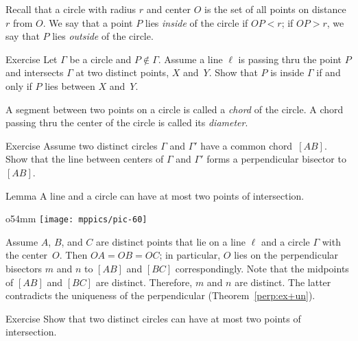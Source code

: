 Recall that a circle with radius $r$ and center $O$ is the set of all points on distance $r$ from $O$.
We say that a point $P$ lies \emph{inside} of the circle if $OP<r$; 
if $OP>r$, we say that $P$ lies \emph{outside} of the circle.
\label{def:circle}

\begin{thm}{Exercise}\label{ex:inside-outside}
Let $\Gamma$ be a circle and $P\notin \Gamma$.
Assume a line $\ell$ is passing thru the point $P$
and intersects $\Gamma$ at two distinct points, $X$ and~$Y$.
Show that $P$ is inside $\Gamma$ if and only if $P$ lies between $X$ and~$Y$.
\end{thm}


A segment between two points on a circle is called a \emph{chord} of the circle.
A chord passing thru the center of the circle is called its \emph{diameter}.

\begin{thm}{Exercise}\label{ex:chord-perp}
Assume two distinct circles $\Gamma$ and $\Gamma'$ have a common chord~$[A B]$.
Show that the line between centers of $\Gamma$ and $\Gamma'$ forms a perpendicular bisector to~$[A B]$.
\end{thm}



\begin{thm}[\abs]{Lemma}\label{lem:line-circle}
A line and a circle can have at most two points of intersection.
\end{thm}

\begin{wrapfigure}{o}{54mm}
\vskip-4mm
\centering
\texttt{[image: mppics/pic-60]}
\end{wrapfigure}

 Assume $A$, $B$, and $C$ are distinct points that lie on a line $\ell$ and a circle $\Gamma$ with the center~$O$.
Then $OA=OB=OC$; in particular, $O$ lies on the perpendicular bisectors 
$m$ and $n$ to $[A B]$ and $[B C]$ correspondingly.
Note that the midpoints of $[AB]$ and $[BC]$ are distinct.
Therefore, $m$ and $n$ are distinct.
The latter contradicts the uniqueness of the perpendicular (Theorem~\ref{perp:ex+un}).
\qeds

\begin{thm}{Exercise}\label{ex:two-circ}
Show that two distinct circles can have at most two points of intersection.
\end{thm}

